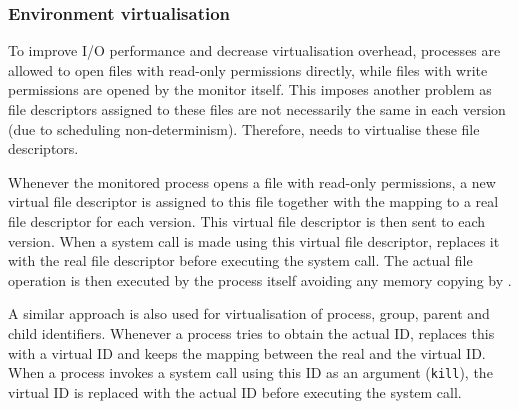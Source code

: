 
\subsubsection{Environment virtualisation}

To improve I/O performance and decrease virtualisation overhead,
processes are allowed to open files with read-only permissions
directly, while files with write permissions are opened by the monitor
itself.  This imposes another problem as file descriptors assigned to
these files are not necessarily the same in each version (\eg due to
scheduling non-determinism). Therefore, \mxm needs to virtualise
these file descriptors.

Whenever the monitored process opens a file with read-only permissions, a
new virtual file descriptor is assigned to this file together with the
mapping to a real file descriptor for each version. This virtual file
descriptor is then sent to each version. When a system call is made
using this virtual file descriptor, \mxm replaces it with the real
file descriptor before executing the system call. The actual file
operation is then executed by the process itself avoiding any memory
copying by \mxm.

A similar approach is also used for virtualisation of process,
group, parent and child identifiers.  Whenever a process tries to obtain
the actual ID, \mxm replaces this with a virtual ID and keeps the
mapping between the real and the virtual ID. When a process invokes a
system call using this ID as an argument (\eg \lstinline`kill`), the
virtual ID is replaced with the actual ID before executing the system
call.



